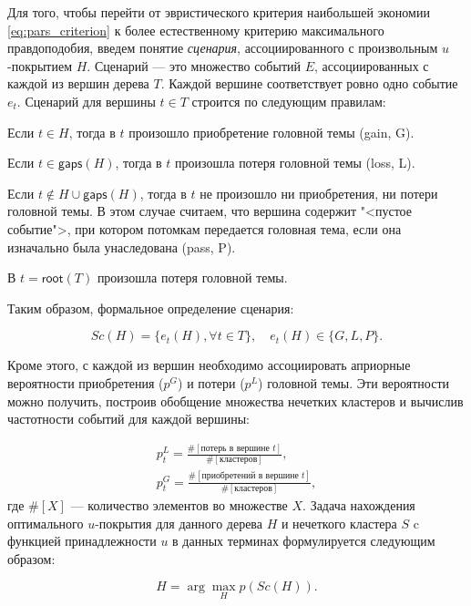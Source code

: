 \documentclass[12pt]{article}
\newenvironment{itemize*}%
{\begin{itemize}%
	\setlength{\itemsep}{0pt}%
	\setlength{\parskip}{0pt}}%
{\end{itemize}}
\let\smallcup\cup
\renewcommand{\cup}{\bigcup}
\begin{document}
Для того, чтобы перейти от эвристического критерия наибольшей экономии \eqref{eq:pars_criterion} к более естественному критерию максимального правдоподобия, введем понятие \textit{сценария}, ассоциированного с произвольным $u$-покрытием $H$. Сценарий --- это множество событий $E$, ассоциированных с каждой из вершин дерева $T$. Каждой вершине соответствует ровно одно событие $e_t$. Сценарий для вершины $t\in T$ строится по следующим правилам:

\begin{itemize*}
	\item Если $t\in H$, тогда  в $t$ произошло приобретение головной темы (gain, G).
	\item Если $t\in \textsf{gaps}(H)$, тогда в $t$ произошла потеря головной темы (loss, L).
	\item Если $t\notin H \smallcup \textsf{gaps}(H)$, тогда в $t$ не произошло ни приобретения, ни потери головной темы. В этом случае считаем, что вершина содержит "<пустое событие">, при котором потомкам передается головная тема, если она изначально была унаследована (pass, P).
	\item В $t=\textsf{root}(T)$ произошла потеря головной темы.
\end{itemize*}
Таким образом, формальное определение сценария:

\begin{equation}
	Sc(H) = \{e_t(H),\forall t\in T\}, \quad e_t(H) \in \{G, L, P\}.
\end{equation}

Кроме этого, с каждой из вершин необходимо ассоциировать априорные вероятности приобретения ($p^G$) и потери ($p^L$) головной темы. Эти вероятности можно получить, построив обобщение множества нечетких кластеров и вычислив частотности событий для каждой вершины:

\begin{equation}
	\begin{gathered}
		p_t^L = \frac{\#[\text{потерь в вершине }t]}{\#[\text{кластеров}]}, \\
		p_t^G = \frac{\#[\text{приобретений в вершине }t]}{\#[\text{кластеров}]},
	\end{gathered}
	\label{eq:loss_gain_freq}
\end{equation}
где $\#[X]$ --- количество элементов во множестве $X$. Задача нахождения оптимального $u$-покрытия для данного дерева $H$ и нечеткого кластера $S$ c функцией принадлежности $u$ в данных терминах формулируется следующим образом:

\begin{equation}
	H = \arg\max_H p(Sc(H)).
\end{equation}
\end{document}
